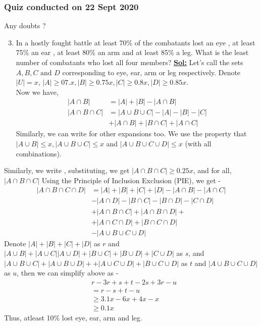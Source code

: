 \documentclass[xcolor=svgnames]{beamer}
\begin{document}
\begin{frame}
\frametitle{Quiz conducted on 22 Sept 2020}
Any doubts ?
\begin{enumerate}\setcounter{enumi}{2}
    \item In a hostly fought battle at least 70\% of the combatants lost an eye , at least 75\% an ear , at least 80\% an arm and at least 85\% a leg. What is the least number of combatants who lost all four members?
    \textbf{\underline{Sol:}} Let's call the sets $A, B, C \text{ and } D$ corresponding to eye, ear, arm or leg respectively. Denote $|U| = x$, $|A| \geq 07.x, |B| \geq 0.75x, |C| \geq 0.8x, |D| \geq 0.85x$. 
    \\ Now we have, 
    \begin{align*}
            |A \cap B| &= |A| + |B| - |A \cap B| 
        \\  |A \cap B \cap C| &= |A \cup B \cup C| - |A| - |B| - |C|
        \\ &+ |A \cap B| + |B \cap C| + |A \cap C|
    \end{align*}
    Similarly, we can write for other expansions too. We use the property that $|A \cup B| \leq x, |A \cup B \cup C| \leq x $ and $|A \cup B \cup C \cup D| \leq x$ (with all combinations).
\end{enumerate}
\end{frame}
\begin{frame}
Similarly, we write , substituting, we get $|A \cap B \cap C| \geq 0.25x$, and for all, $|A \cap B \cap C|$
    Using the Principle of Inclusion Exclusion (PIE), we get - 
    \begin{align*}
        |A \cap B \cap C \cap D| &= |A| + |B| + |C| + |D| - |A \cap B| - |A \cap C| \\
        &- |A \cap D| - |B \cap C| - |B \cap D|- |C \cap D|\\
        & + |A \cap B \cap C| + |A \cap B \cap D| +
        \\ & + |A \cap C \cap D| + |B \cap C \cap D| 
        \\ & - |A \cup B \cup C \cup D|
    \end{align*}
    Denote $|A| + |B| + |C| + |D|$ as $r$ and $ |A \cup B| + |A \cup C|  |A \cup D| + |B \cup C| + |B \cup D| + |C \cup D|$ as $s$, and $|A \cup B \cup C| + |A \cup B \cup D| +
        + |A \cup C \cup D| + |B \cup C \cup D| $ as $t$ and $|A \cup B \cup C \cup D|$ as $u$, then we can simplify above as - 
        \begin{align*}
            & r - 3r + s+ t - 2s + 3r - u 
            \\ &= r - s + t  - u
            \\ & \geq 3.1x - 6x + 4x - x
            \\ & \geq 0.1x
        \end{align*}
Thus, atleast 10\% lost eye, ear, arm and leg.
\end{frame}
\end{document}
